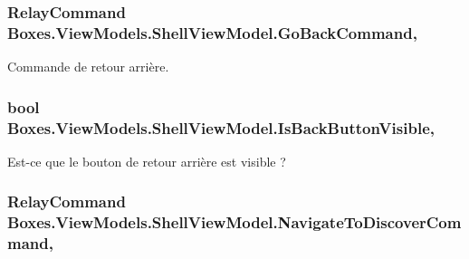 \subsubsection[{\texorpdfstring{Go\+Back\+Command}{GoBackCommand}}]{\setlength{\rightskip}{0pt plus 5cm}Relay\+Command Boxes.\+View\+Models.\+Shell\+View\+Model.\+Go\+Back\+Command\hspace{0.3cm}{\ttfamily [get]}, {}}\hypertarget{class_boxes_1_1_view_models_1_1_shell_view_model_a79515d296d20f7589540705d0e708d2f}{}\label{class_boxes_1_1_view_models_1_1_shell_view_model_a79515d296d20f7589540705d0e708d2f}


Commande de retour arrière. 

\subsubsection[{\texorpdfstring{Is\+Back\+Button\+Visible}{IsBackButtonVisible}}]{\setlength{\rightskip}{0pt plus 5cm}bool Boxes.\+View\+Models.\+Shell\+View\+Model.\+Is\+Back\+Button\+Visible\hspace{0.3cm}{\ttfamily [get]}, {\ttfamily [set]}}\hypertarget{class_boxes_1_1_view_models_1_1_shell_view_model_a5c1cb0f080c2bceb2419be4586b839f3}{}\label{class_boxes_1_1_view_models_1_1_shell_view_model_a5c1cb0f080c2bceb2419be4586b839f3}


Est-\/ce que le bouton de retour arrière est visible ? 

\subsubsection[{\texorpdfstring{Navigate\+To\+Discover\+Command}{NavigateToDiscoverCommand}}]{\setlength{\rightskip}{0pt plus 5cm}Relay\+Command Boxes.\+View\+Models.\+Shell\+View\+Model.\+Navigate\+To\+Discover\+Command\hspace{0.3cm}{\ttfamily [get]}, {}}\hypertarget{class_boxes_1_1_view_models_1_1_shell_view_model_abe1ff38e661982f6c4e2e7cdc0036a40}{}\label{class_boxes_1_1_view_models_1_1_shell_view_model_abe1ff38e661982f6c4e2e7cdc0036a40}


